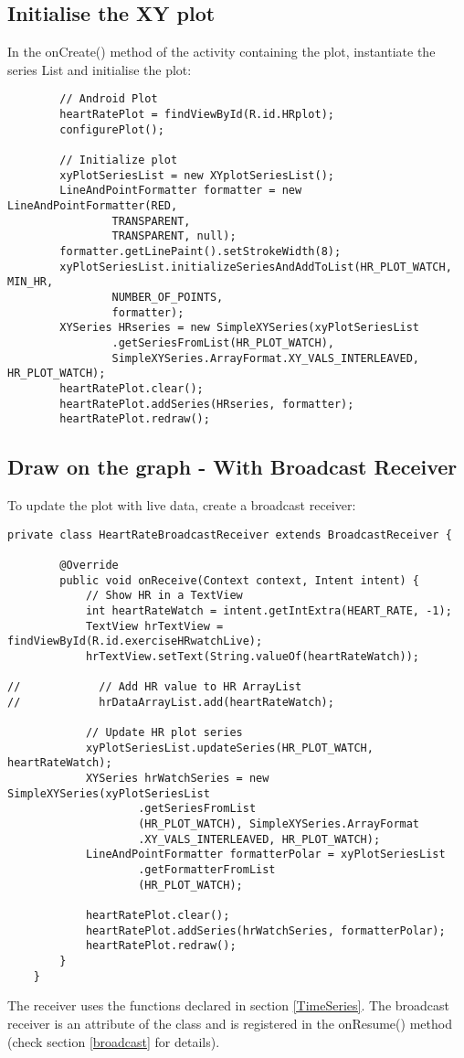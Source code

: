 \documentclass[11pt]{article}
\begin{document}
\subsection{Initialise the XY plot}
In the onCreate() method of the activity containing the plot, instantiate the series List and initialise the plot: 
\begin{lstlisting}
		// Android Plot
        heartRatePlot = findViewById(R.id.HRplot);
        configurePlot();

        // Initialize plot
        xyPlotSeriesList = new XYplotSeriesList();
        LineAndPointFormatter formatter = new LineAndPointFormatter(RED,
                TRANSPARENT,
                TRANSPARENT, null);
        formatter.getLinePaint().setStrokeWidth(8);
        xyPlotSeriesList.initializeSeriesAndAddToList(HR_PLOT_WATCH, MIN_HR,
                NUMBER_OF_POINTS,
                formatter);
        XYSeries HRseries = new SimpleXYSeries(xyPlotSeriesList
                .getSeriesFromList(HR_PLOT_WATCH),
                SimpleXYSeries.ArrayFormat.XY_VALS_INTERLEAVED, HR_PLOT_WATCH);
        heartRatePlot.clear();
        heartRatePlot.addSeries(HRseries, formatter);
        heartRatePlot.redraw();
\end{lstlisting}

\subsection{Draw on the graph - With Broadcast Receiver}
To update the plot with live data, create a broadcast receiver:
\begin{lstlisting}
private class HeartRateBroadcastReceiver extends BroadcastReceiver {

        @Override
        public void onReceive(Context context, Intent intent) {
            // Show HR in a TextView
            int heartRateWatch = intent.getIntExtra(HEART_RATE, -1);
            TextView hrTextView = findViewById(R.id.exerciseHRwatchLive);
            hrTextView.setText(String.valueOf(heartRateWatch));

//            // Add HR value to HR ArrayList
//            hrDataArrayList.add(heartRateWatch);

            // Update HR plot series
            xyPlotSeriesList.updateSeries(HR_PLOT_WATCH, heartRateWatch);
            XYSeries hrWatchSeries = new SimpleXYSeries(xyPlotSeriesList
                    .getSeriesFromList
                    (HR_PLOT_WATCH), SimpleXYSeries.ArrayFormat
                    .XY_VALS_INTERLEAVED, HR_PLOT_WATCH);
            LineAndPointFormatter formatterPolar = xyPlotSeriesList
                    .getFormatterFromList
                    (HR_PLOT_WATCH);

            heartRatePlot.clear();
            heartRatePlot.addSeries(hrWatchSeries, formatterPolar);
            heartRatePlot.redraw();
        }
    }
\end{lstlisting}
The receiver uses the functions declared in section \ref{TimeSeries}. The broadcast receiver is an attribute of the class and is registered in the onResume() method (check section \ref{broadcast} for details). 
\end{document}
